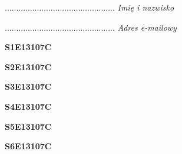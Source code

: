 \begin{turn}{90}\begin{minipage}{\linewidth} \vspace{20mm} ................................................  \textit{Imię i nazwisko}\end{minipage}\end{turn}

\begin{turn}{90}\begin{minipage}{\linewidth} \vspace{20mm} ................................................  \textit{Adres e-mailowy}\end{minipage}\end{turn}

\begin{turn}{90}\huge \begin{minipage}{\linewidth} \vspace{10mm}\textbf{S1E13107C}\end{minipage}\end{turn}

\begin{turn}{90}\huge \begin{minipage}{\linewidth} \vspace{10mm}\textbf{S2E13107C}\end{minipage}\end{turn}

\begin{turn}{90}\huge \begin{minipage}{\linewidth} \vspace{10mm}\textbf{S3E13107C}\end{minipage}\end{turn}

\begin{turn}{90}\huge \begin{minipage}{\linewidth} \vspace{10mm}\textbf{S4E13107C}\end{minipage}\end{turn}

\begin{turn}{90}\huge \begin{minipage}{\linewidth} \vspace{10mm}\textbf{S5E13107C}\end{minipage}\end{turn}

\begin{turn}{90}\huge \begin{minipage}{\linewidth} \vspace{10mm}\textbf{S6E13107C}\end{minipage}\end{turn}

